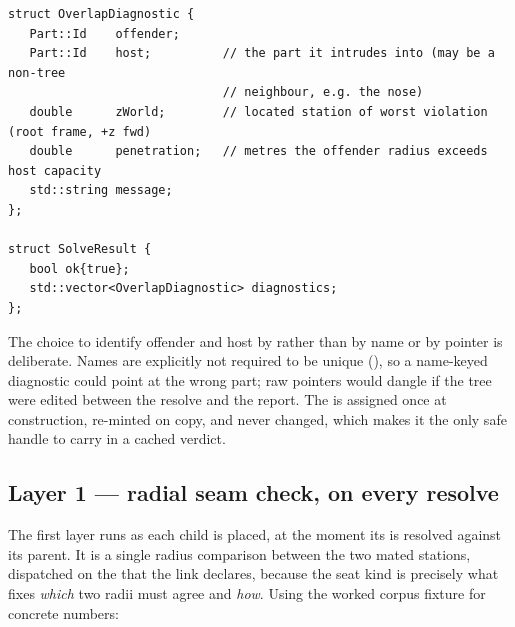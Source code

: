 \begin{listing}[htbp]
\begin{verbatim}
struct OverlapDiagnostic {
   Part::Id    offender;
   Part::Id    host;          // the part it intrudes into (may be a non-tree
                              // neighbour, e.g. the nose)
   double      zWorld;        // located station of worst violation (root frame, +z fwd)
   double      penetration;   // metres the offender radius exceeds host capacity
   std::string message;
};

struct SolveResult {
   bool ok{true};
   std::vector<OverlapDiagnostic> diagnostics;
};
\end{verbatim}
\caption{The diagnostics verdict types.  and  are
  values (), the stable
per-instance identifiers retrieved via  (); every
instance, including a  copy, carries a distinct id (a copy is re-minted to a fresh one,
) that never changes once assigned, so attribution is
unambiguous even when two parts share a human-facing name (which need not be unique,
).}\label{lst:diagstructs}
\end{listing}

The choice to identify offender and host by  rather than by name or by pointer is
deliberate. Names are explicitly not required to be unique (), so a
name-keyed diagnostic could point at the wrong part; raw pointers would dangle if the tree were
edited between the resolve and the report. The  is assigned once at construction,
re-minted on copy, and never changed, which makes it the only safe handle to carry in a cached
verdict.

\subsection{Layer 1 --- radial seam check, on every resolve}

The first layer runs as each child is placed, at the moment its  is resolved
against its parent. It is a single radius comparison between the two mated stations, dispatched
on the  that the link declares, because the seat kind is precisely what fixes
\emph{which} two radii must agree and \emph{how}. Using the worked corpus fixture
 for concrete numbers:

